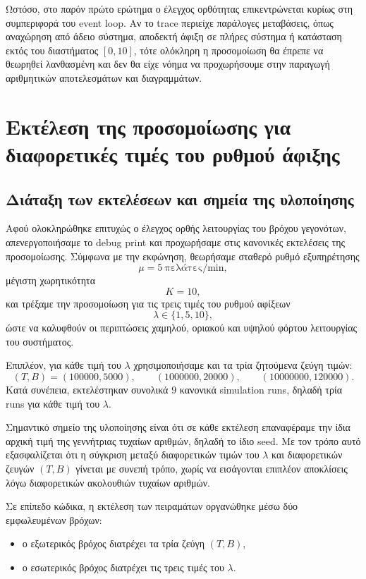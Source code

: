 \documentclass{article}
\begin{document}
Ωστόσο, στο παρόν πρώτο ερώτημα ο έλεγχος ορθότητας επικεντρώνεται κυρίως στη συμπεριφορά του \foreignlanguage{english}{event loop}. Αν το \foreignlanguage{english}{trace} περιείχε παράλογες μεταβάσεις, όπως αναχώρηση από άδειο σύστημα, αποδεκτή άφιξη σε πλήρες σύστημα ή κατάσταση εκτός του διαστήματος $[0,10]$, τότε ολόκληρη η προσομοίωση θα έπρεπε να θεωρηθεί λανθασμένη και δεν θα είχε νόημα να προχωρήσουμε στην παραγωγή αριθμητικών αποτελεσμάτων και διαγραμμάτων.

\newpage
\section{Εκτέλεση της προσομοίωσης για διαφορετικές τιμές του ρυθμού άφιξης}

\subsection{Διάταξη των εκτελέσεων και σημεία της υλοποίησης}

Αφού ολοκληρώθηκε επιτυχώς ο έλεγχος ορθής λειτουργίας του βρόχου γεγονότων, απενεργοποιήσαμε το \foreignlanguage{english}{debug print} και προχωρήσαμε στις κανονικές εκτελέσεις της προσομοίωσης. Σύμφωνα με την εκφώνηση, θεωρήσαμε σταθερό ρυθμό εξυπηρέτησης
\[
\mu = 5 \ \text{πελάτες/min},
\]
μέγιστη χωρητικότητα
\[
K = 10,
\]
και τρέξαμε την προσομοίωση για τις τρεις τιμές του ρυθμού αφίξεων
\[
\lambda \in \{1,5,10\},
\]
ώστε να καλυφθούν οι περιπτώσεις χαμηλού, οριακού και υψηλού φόρτου λειτουργίας του συστήματος.

Επιπλέον, για κάθε τιμή του $\lambda$ χρησιμοποιήσαμε και τα τρία ζητούμενα ζεύγη τιμών:
\[
(T,B) = (100000,5000),\qquad (1000000,20000),\qquad (10000000,120000).
\]
Κατά συνέπεια, εκτελέστηκαν συνολικά $9$ κανονικά \foreignlanguage{english}{simulation runs}, δηλαδή τρία \foreignlanguage{english}{runs} για κάθε τιμή του $\lambda$.

Σημαντικό σημείο της υλοποίησης είναι ότι σε κάθε εκτέλεση επαναφέραμε την ίδια αρχική τιμή της γεννήτριας τυχαίων αριθμών, δηλαδή το ίδιο \foreignlanguage{english}{seed}. Με τον τρόπο αυτό εξασφαλίζεται ότι η σύγκριση μεταξύ διαφορετικών τιμών του $\lambda$ και διαφορετικών ζευγών $(T,B)$ γίνεται με συνεπή τρόπο, χωρίς να εισάγονται επιπλέον αποκλίσεις λόγω διαφορετικών ακολουθιών τυχαίων αριθμών.

Σε επίπεδο κώδικα, η εκτέλεση των πειραμάτων οργανώθηκε μέσω δύο εμφωλευμένων βρόχων:
\begin{itemize}
    \item ο εξωτερικός βρόχος διατρέχει τα τρία ζεύγη $(T,B)$,
    \item ο εσωτερικός βρόχος διατρέχει τις τρεις τιμές του $\lambda$.
\end{itemize}
\end{document}
